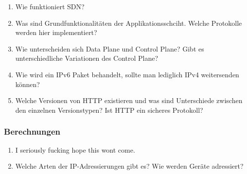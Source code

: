 \documentclass{scrartcl}
\begin{document}
\begin{enumerate}
        \item Wie funktioniert SDN?
        \item Was sind Grundfunktionalitäten der Applikationsschciht. Welche Protokolle werden hier implementiert?
        \item Wie unterscheiden sich Data Plane und Control Plane? Gibt es unterschiedliche Variationen des Control Plane?
        \item Wie wird ein IPv6 Paket behandelt, sollte man lediglich IPv4 weitersenden können?
        \item Welche Versionen von HTTP existieren und was sind Unterschiede zwischen den einzelnen Versionstypen? Ist HTTP ein sicheres Protokoll?
    \end{enumerate}
    \subsubsection{Berechnungen}
    \begin{enumerate}
        \item I seriously fucking hope this wont come.
        \item Welche Arten der IP-Adressierungen gibt es? Wie werden Geräte adressiert? %
    \end{enumerate}
\end{document}
